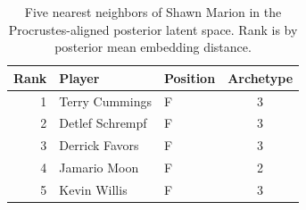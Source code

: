 \begin{table}[htbp]
  \centering\small
  \begin{tabular}{rllc}
    \toprule
    Rank & Player & Position & Archetype \\
    \midrule
    1 & Terry Cummings & F & 3 \\
    2 & Detlef Schrempf & F & 3 \\
    3 & Derrick Favors & F & 3 \\
    4 & Jamario Moon & F & 2 \\
    5 & Kevin Willis & F & 3 \\
    \bottomrule
  \end{tabular}
  \caption{Five nearest neighbors of Shawn Marion in the Procrustes-aligned posterior latent space. Rank is by posterior mean embedding distance.}
  \label{tab:Shawn_Marion_neighbors}
\end{table}

